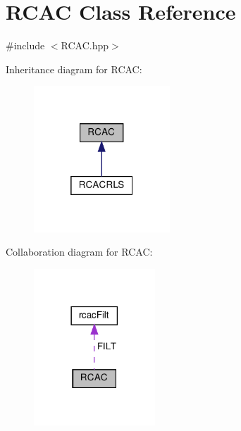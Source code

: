 \hypertarget{class_r_c_a_c}{}\section{R\+C\+AC Class Reference}
\label{class_r_c_a_c}


{\ttfamily \#include $<$R\+C\+A\+C.\+hpp$>$}



Inheritance diagram for R\+C\+AC\+:\nopagebreak
\begin{figure}[H]
\begin{center}
\leavevmode
\includegraphics[width=145pt]{class_r_c_a_c__inherit__graph}
\end{center}
\end{figure}


Collaboration diagram for R\+C\+AC\+:\nopagebreak
\begin{figure}[H]
\begin{center}
\leavevmode
\includegraphics[width=129pt]{class_r_c_a_c__coll__graph}
\end{center}
\end{figure}
